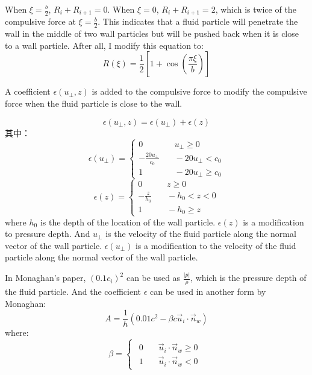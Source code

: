 When $\xi=\frac{b}{2}$, $R_{i}+R_{i+1}=0$. 
When $\xi=0$, $R_{i}+R_{i+1}=2$, which is twice of the compulsive force at $\xi=\frac{b}{2}$.
This indicates that a fluid particle will penetrate the wall in the middle of two wall particles 
but will be pushed back when it is close to a wall particle.
After all, I modify this equation to:
\begin{equation}
    R(\xi)=\frac{1}{2}\left[
        1+\cos\left(\frac{\pi\xi}{b}\right)
    \right]
\end{equation}

A coefficient $\epsilon(u_{\perp},z)$ is added to the compulsive force to 
modify the compulsive force when the fluid particle is close to the wall.

\begin{equation}
    \epsilon(u_{\perp},z)=\epsilon (u_{\perp})+\epsilon(z)
\end{equation}
其中：
\begin{equation}
    \epsilon(u_{\perp})=
    \begin{cases}
        0 &\quad u_{\perp}\geq 0\\
        -\frac{20u_{\perp}}{c_0} &\quad -20u_{\perp}<c_0\\
        1 &\quad -20u_{\perp}\geq c_0
    \end{cases}
\end{equation}
\begin{equation}
    \epsilon(z)=
    \begin{cases}
        0 &\quad z\geq 0\\
        -\frac{z}{h_0} &\quad -h_0<z<0\\
        1 &\quad -h_0\geq z
    \end{cases}
\end{equation}
where $h_0$ is the depth of the location of the wall particle. 
$\epsilon(z)$ is a modification to pressure depth.
And $u_{\perp}$ is the velocity of the fluid particle along the normal vector of the wall particle.
$\epsilon(u_{\perp})$ is a modification to the velocity of the fluid particle along the normal vector of the wall particle.

In Monaghan's paper, 
$(0.1c_i)^2$ can be used as $\frac{|p|}{\rho}$, 
which is the pressure depth of the fluid particle. 
And the coefficient $\epsilon$ can be used in another form by Monaghan:
\begin{equation}
    A=\frac{1}{h}(0.01c^2 -\beta c\vec{u}_i\cdot\vec{n}_w)
\end{equation}
where:
\begin{equation}
    \beta=
    \begin{cases}
        \begin{aligned}
            0 &\quad \vec{u}_i\cdot\vec{n}_w\geq 0\\
            1 &\quad \vec{u}_i\cdot\vec{n}_w<0
        \end{aligned}
    \end{cases}
\end{equation}

